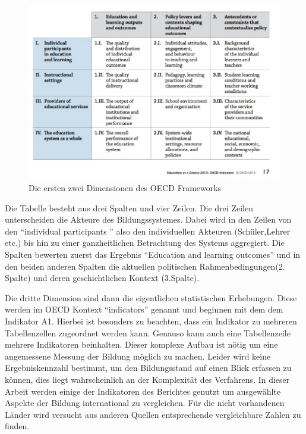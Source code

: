 \begin{figure}[H]
\includegraphics[width=13cm]{./images/oecdframe.jpg}
\center
\caption{Die ersten zwei Dimensionen des OECD Frameworks \cite[17]{oecd5} }
\end{figure}



Die Tabelle besteht aus drei Spalten und vier Zeilen. Die drei Zeilen unterscheiden die Akteure des Bildungssystemes. Dabei wird in den Zeilen von den ``individual participants '' also den individuellen Akteuren (Schüler,Lehrer etc.) bis hin zu einer ganzheitlichen Betrachtung des Systems aggregiert. Die Spalten bewerten zuerst das Ergebnis ``Education and learning outcomes'' und in den beiden anderen Spalten die aktuellen politischen Rahmenbedingungen(2. Spalte) und deren geschichtlichen Kontext (3.Spalte).

Die dritte Dimension sind dann die eigentlichen statistischen Erhebungen. Diese werden im OECD Kontext ``indicators'' genannt und beginnen mit dem dem Indikator A1.
Hierbei ist besonders zu beachten, dass ein Indikator zu mehreren Tabellenzellen zugeordnet werden kann. Genauso kann auch eine Tabellenzeile mehrere Indikatoren beinhalten.
Dieser komplexe Aufbau ist nötig um eine angemessene Messung der Bildung möglich zu machen. Leider wird keine Ergebniskennzahl bestimmt, um den Bildungsstand auf einen Blick erfassen zu können, dies liegt wahrscheinlich an der Komplexität des Verfahrens.
In dieser Arbeit werden einige der Indikatoren des Berichtes genutzt um ausgewählte Aspekte der Bildung international zu vergleichen. Für die nicht vorhandenen Länder wird versucht aus anderen Quellen entsprechende vergleichbare Zahlen zu finden.

